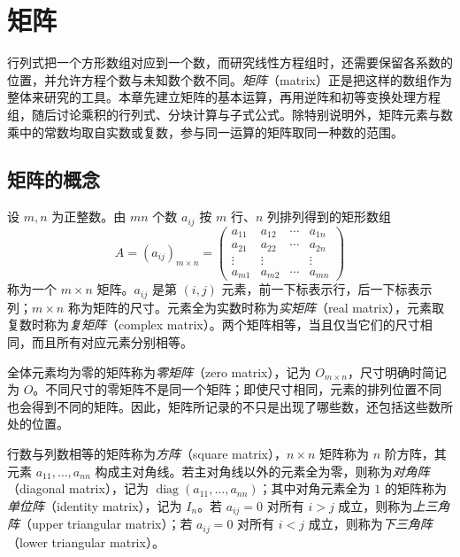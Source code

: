 \setcounter{chapter}{1} %
\chapter{矩阵}
\label{chap:matrix}

行列式把一个方形数组对应到一个数，而研究线性方程组时，还需要保留各系数的位置，并允许方程个数与未知数个数不同。\emph{矩阵}（matrix）正是把这样的数组作为整体来研究的工具。本章先建立矩阵的基本运算，再用逆阵和初等变换处理方程组，随后讨论乘积的行列式、分块计算与子式公式。除特别说明外，矩阵元素与数乘中的常数均取自实数或复数，参与同一运算的矩阵取同一种数的范围。

\section{矩阵的概念}
\label{sec:matrix-concept}

\begin{definition}
\label{def:matrix-array}
设 $m,n$ 为正整数。由 $mn$ 个数 $a_{ij}$ 按 $m$ 行、$n$ 列排列得到的矩形数组
\[
    A=(a_{ij})_{m\times n}
    =\begin{pmatrix}
        a_{11}&a_{12}&\cdots&a_{1n}\\
        a_{21}&a_{22}&\cdots&a_{2n}\\
        \vdots&\vdots&&\vdots\\
        a_{m1}&a_{m2}&\cdots&a_{mn}
    \end{pmatrix}
\]
称为一个 $m\times n$ 矩阵。$a_{ij}$ 是第 $(i,j)$ 元素，前一下标表示行，后一下标表示列；$m\times n$ 称为矩阵的尺寸。元素全为实数时称为\emph{实矩阵}（real matrix），元素取复数时称为\emph{复矩阵}（complex matrix）。两个矩阵相等，当且仅当它们的尺寸相同，而且所有对应元素分别相等。
\end{definition}

全体元素均为零的矩阵称为\emph{零矩阵}（zero matrix），记为 $O_{m\times n}$，尺寸明确时简记为 $O$。不同尺寸的零矩阵不是同一个矩阵；即使尺寸相同，元素的排列位置不同也会得到不同的矩阵。因此，矩阵所记录的不只是出现了哪些数，还包括这些数所处的位置。

\begin{definition}
\label{def:matrix-special-forms}
行数与列数相等的矩阵称为\emph{方阵}（square matrix），$n\times n$ 矩阵称为 $n$ 阶方阵，其元素 $a_{11},\ldots,a_{nn}$ 构成主对角线。若主对角线以外的元素全为零，则称为\emph{对角阵}（diagonal matrix），记为 $\operatorname{diag}(a_{11},\ldots,a_{nn})$；其中对角元素全为 $1$ 的矩阵称为\emph{单位阵}（identity matrix），记为 $I_n$。若 $a_{ij}=0$ 对所有 $i>j$ 成立，则称为\emph{上三角阵}（upper triangular matrix）；若 $a_{ij}=0$ 对所有 $i<j$ 成立，则称为\emph{下三角阵}（lower triangular matrix）。
\end{definition}

